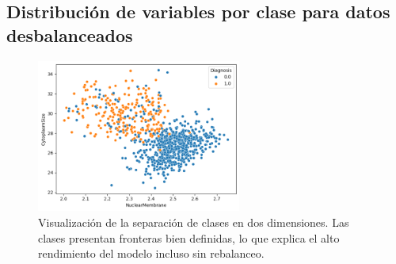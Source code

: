 \documentclass[11pt]{article}
\begin{document}
\subsection{Distribución de variables por clase para datos desbalanceados}

\begin{figure}[H]
    \centering
    \includegraphics[width=0.6\textwidth]{figures/separability_scatter.png}
    \caption{Visualización de la separación de clases en dos dimensiones. Las clases presentan fronteras bien definidas, lo que explica el alto rendimiento del modelo incluso sin rebalanceo.}
    \label{fig:scatter_appendix}
\end{figure}
\end{document}
